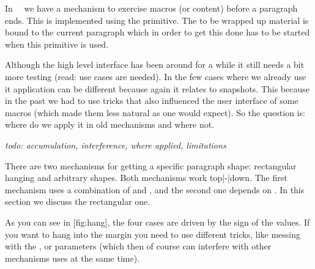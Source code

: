 \stopsection

\startsection[title=Wrapping up]

In \CONTEXT\ \LMTX\ we have a mechanism to exercise macros (or content) before a
paragraph ends. This is implemented using the \type {\wrapuppar} primitive. The
to be wrapped up material is bound to the current paragraph which in order to
get this done has to be started when this primitive is used.

Although the high level interface has been around for a while it still needs a
bit more testing (read: use cases are needed). In the few cases where we already
use it application can be different because again it relates to snapshots. This
because in the past we had to use tricks that also influenced the user interface
of some macros (which made them less natural as one would expect). So the
question is: where do we apply it in old mechanisms and where not.

{\em todo: accumulation, interference, where applied, limitations}


\stopsection

\startsection[title=Hanging]

There are two mechanisms for getting a specific paragraph shape: rectangular
hanging and arbitrary shapes. Both mechanisms work top|-|down. The first
mechanism uses a combination of \type {\hangafter} and \type {\hangindent}, and
the second one depends on \type {\parshape}. In this section we discuss the
rectangular one.

\startbuffer[hang]
 \hangindent  4cm  \page
{} \hangindent  4cm  \page
{} \hangindent -4cm  \page
{} \hangindent -4cm  \page
\stopbuffer

\typebuffer[hang][option=TEX]

As you can see in  [fig:hang], the four cases are driven by the sign
of the values. If you want to hang into the margin you need to use different
tricks, like messing with the \type {\leftskip}, \type {\rightskip} or \type
{\parindent} parameters (which then of course can interfere with other mechanisms
uses at the same time).

